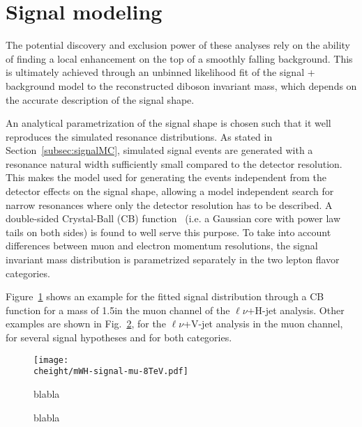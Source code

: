 \section{Signal modeling}\label{sec:signalModel}

The potential discovery and exclusion power of these analyses rely on the ability of finding a local enhancement on the top of a smoothly falling background. 
This is ultimately achieved through an unbinned likelihood fit of the signal + background model to the reconstructed diboson invariant mass, which depends on the accurate description of the signal shape.

An analytical parametrization of the signal shape is chosen such that it well reproduces the simulated resonance distributions.
As stated in Section~\ref{subsec:signalMC}, simulated signal events are generated with a resonance natural width sufficiently small compared to the detector resolution.
This makes the model used for generating the events independent from the detector effects on the signal shape, allowing a model independent search for narrow resonances
where only the detector resolution has to be described. A double-sided Crystal-Ball (CB) function~\cite{CrystalBallRef} (i.e. a Gaussian core with power law tails on both sides) is found to well serve this purpose.
To take into account differences between muon and electron momentum resolutions, the signal invariant mass distribution is parametrized separately in the two lepton flavor categories.

Figure~\ref{fig:mWHfit-signal-8TeV} shows an example for the fitted signal distribution through a CB function for a \Wpr mass of 1.5\TeV in the muon channel of the $\ell\nu$+H-jet analysis.
Other examples are shown in Fig.~\ref{fig:mWVfit-signal-13TeV}, for the $\ell\nu$+V-jet analysis in the muon channel, for several signal hypotheses and for both \mJ categories.

\begin{figure}[!htb]
\centering
\texttt{[image: \\cheight/mWH-signal-mu-8TeV.pdf]}
\caption{blabla}
\label{fig:mWHfit-signal-8TeV}
\end{figure}

\begin{figure}[!htb]
\centering
{}
\caption{blabla}
\label{fig:mWVfit-signal-13TeV}
\end{figure}

